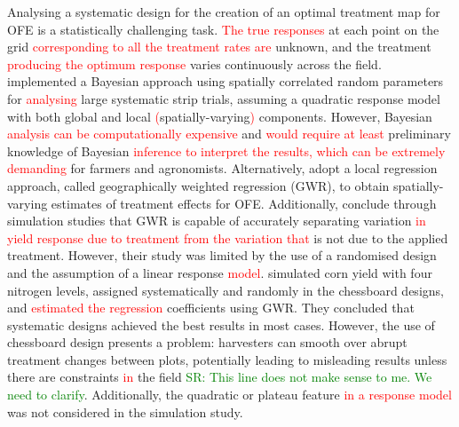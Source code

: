 \documentclass[a4paper]{article} 	%
\newcommand{\revision}[1]{\textcolor{red}{#1}}
\begin{document}
Analysing a systematic design for the creation of an optimal treatment map for OFE is a statistically challenging task. \revision{The true responses} at each point on the grid \revision{corresponding to all the treatment rates are} unknown, and the treatment \revision{producing the optimum response} varies continuously across the field. \textcite{Cao2022Bayesian} implemented a Bayesian approach using spatially correlated random parameters for \revision{analysing} large systematic strip trials, assuming a quadratic response model with both global and local \revision{(}spatially-varying\revision{)} components. However, Bayesian \revision{analysis can be computationally expensive} and \revision{would require at least} preliminary knowledge of Bayesian \revision{inference to interpret the results, which can be extremely demanding} for farmers and agronomists. Alternatively, \textcite{Rakshit2020Novel} adopt a local regression approach, called geographically weighted regression (GWR), to obtain spatially-varying estimates of treatment effects for OFE. Additionally, \textcite{Evans2020Assessment} conclude through simulation studies that GWR is capable of accurately separating variation \revision{in yield response due to treatment from} \revision{the variation that} is not due to the applied treatment. However, their study was limited by the use of a randomised design and the assumption of a linear response \revision{model}. \textcite{Alesso2021Design} simulated corn yield with four nitrogen levels, assigned systematically and randomly in the chessboard designs, and \revision{estimated the regression} coefficients using GWR. They concluded that systematic designs achieved the best results in most cases. However, the use of chessboard design presents a problem: harvesters can smooth over abrupt treatment changes between plots, potentially leading to misleading results unless there are constraints \revision{in} the field \parencite{Pringle2004FieldScale} \textcolor{green}{SR: This line does not make sense to me. We need to clarify}. Additionally, the quadratic or plateau feature \revision{in a response model} was not considered in the simulation study.

\end{document}
